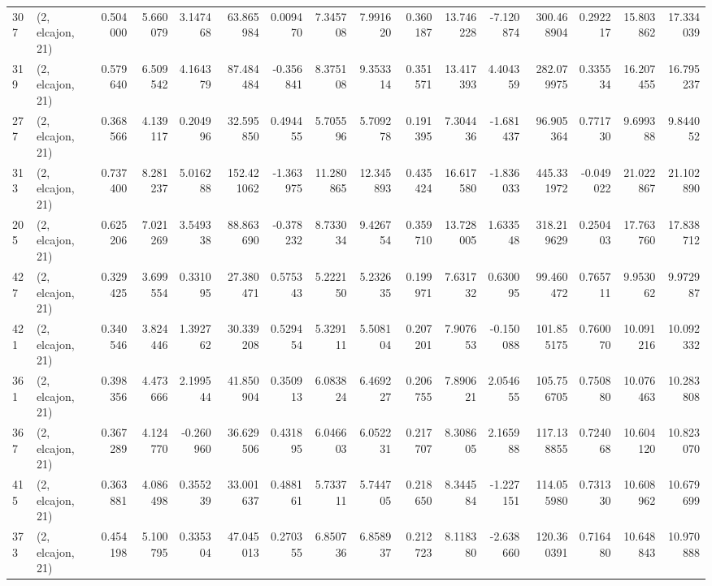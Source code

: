 \begin{tabular}{llrrrrrrrrrrrrrr}
307 &  (2, elcajon, 21) &   0.504000 &   5.660079 &   3.147468 &    63.865984 &   0.009470 &   7.345708 &   7.991620 &  0.360187 &  13.746228 &  -7.120874 &   300.468904 &   0.292217 &  15.803862 &  17.334039 \\
319 &  (2, elcajon, 21) &   0.579640 &   6.509542 &   4.164379 &    87.484484 &  -0.356841 &   8.375108 &   9.353314 &  0.351571 &  13.417393 &   4.404359 &   282.079975 &   0.335534 &  16.207455 &  16.795237 \\
277 &  (2, elcajon, 21) &   0.368566 &   4.139117 &   0.204996 &    32.595850 &   0.494455 &   5.705596 &   5.709278 &  0.191395 &   7.304436 &  -1.681437 &    96.905364 &   0.771730 &   9.699388 &   9.844052 \\
313 &  (2, elcajon, 21) &   0.737400 &   8.281237 &   5.016288 &   152.421062 &  -1.363975 &  11.280865 &  12.345893 &  0.435424 &  16.617580 &  -1.836033 &   445.331972 &  -0.049022 &  21.022867 &  21.102890 \\
205 &  (2, elcajon, 21) &   0.625206 &   7.021269 &   3.549338 &    88.863690 &  -0.378232 &   8.733034 &   9.426754 &  0.359710 &  13.728005 &   1.633548 &   318.219629 &   0.250403 &  17.763760 &  17.838712 \\
427 &  (2, elcajon, 21) &   0.329425 &   3.699554 &   0.331095 &    27.380471 &   0.575343 &   5.222150 &   5.232635 &  0.199971 &   7.631732 &   0.630095 &    99.460472 &   0.765711 &   9.953062 &   9.972987 \\
421 &  (2, elcajon, 21) &   0.340546 &   3.824446 &   1.392762 &    30.339208 &   0.529454 &   5.329111 &   5.508104 &  0.207201 &   7.907653 &  -0.150088 &   101.855175 &   0.760070 &  10.091216 &  10.092332 \\
361 &  (2, elcajon, 21) &   0.398356 &   4.473666 &   2.199544 &    41.850904 &   0.350913 &   6.083824 &   6.469227 &  0.206755 &   7.890621 &   2.054655 &   105.756705 &   0.750880 &  10.076463 &  10.283808 \\
367 &  (2, elcajon, 21) &   0.367289 &   4.124770 &  -0.260960 &    36.629506 &   0.431895 &   6.046603 &   6.052231 &  0.217707 &   8.308605 &   2.165988 &   117.138855 &   0.724068 &  10.604120 &  10.823070 \\
415 &  (2, elcajon, 21) &   0.363881 &   4.086498 &   0.355239 &    33.001637 &   0.488161 &   5.733711 &   5.744705 &  0.218650 &   8.344584 &  -1.227151 &   114.055980 &   0.731330 &  10.608962 &  10.679699 \\
373 &  (2, elcajon, 21) &   0.454198 &   5.100795 &   0.335304 &    47.045013 &   0.270355 &   6.850736 &   6.858937 &  0.212723 &   8.118380 &  -2.638660 &   120.360391 &   0.716480 &  10.648843 &  10.970888 \\

\end{tabular}
